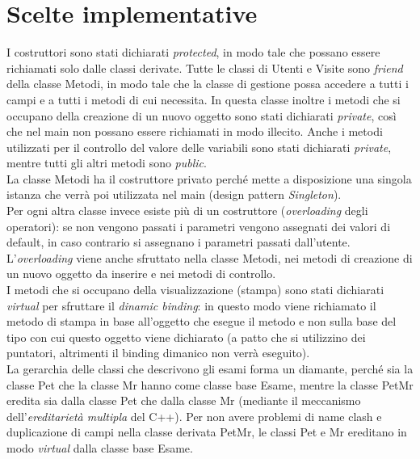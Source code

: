\documentclass[a4paper,12pt]{article}
\begin{document}
{%
\clearpage
\newpage
\section*{Scelte implementative} 
I costruttori sono stati dichiarati \textit{protected}, in modo tale che possano essere richiamati solo dalle classi derivate. Tutte le classi di Utenti e Visite sono \textit{friend} della classe Metodi, in modo tale che la classe di gestione possa accedere a tutti i campi e a tutti i metodi di cui necessita. In questa classe inoltre i metodi che si occupano della creazione di un nuovo oggetto sono stati dichiarati \textit{private}, così che nel main non possano essere richiamati in modo illecito. Anche i metodi utilizzati per il controllo del valore delle variabili sono stati dichiarati \textit{private}, mentre tutti gli altri metodi sono \textit{public}. \\
La classe Metodi ha il costruttore privato perché mette a disposizione una singola istanza che verrà poi utilizzata nel main (design pattern \textit{Singleton}). \\
Per ogni altra classe invece esiste più di un costruttore (\textit{overloading} degli operatori): se non vengono passati i parametri vengono assegnati dei valori di default, in caso contrario si assegnano i parametri passati dall'utente. L'\textit{overloading} viene anche sfruttato nella classe Metodi, nei metodi di creazione di un nuovo oggetto da inserire e nei metodi di controllo. \\
I metodi che si occupano della visualizzazione (stampa) sono stati dichiarati \textit{virtual} per sfruttare il \textit{dinamic binding}: in questo modo viene richiamato il metodo di stampa in base all'oggetto che esegue il metodo e non sulla base del tipo con cui questo oggetto viene dichiarato (a patto che si utilizzino dei puntatori, altrimenti il binding dimanico non verrà eseguito). \\
La gerarchia delle classi che descrivono gli esami forma un diamante, perché sia la classe Pet che la classe Mr hanno come classe base Esame, mentre la classe PetMr eredita sia dalla classe Pet che dalla classe Mr (mediante il meccanismo dell’\textit{ereditarietà multipla} del C++). Per non avere problemi di name clash e duplicazione di campi nella classe derivata PetMr, le classi Pet e Mr ereditano in modo \textit{virtual} dalla classe base Esame.  \\
}
\end{document}
